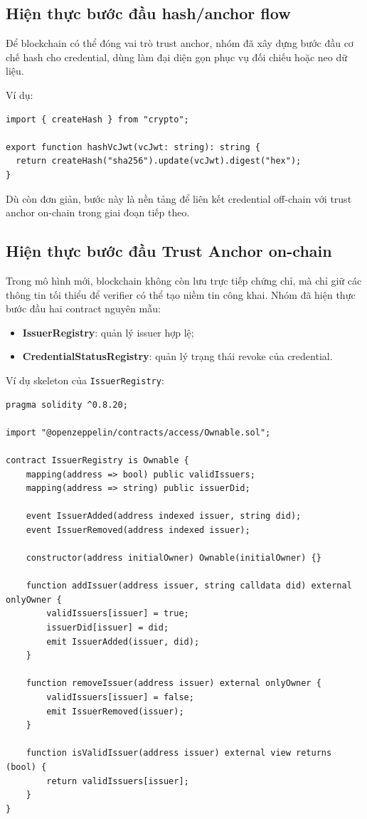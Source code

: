 \subsection{Hiện thực bước đầu hash/anchor flow}

Để blockchain có thể đóng vai trò trust anchor, nhóm đã xây dựng bước đầu cơ chế hash cho credential, dùng làm đại diện gọn phục vụ đối chiếu hoặc neo dữ liệu.

Ví dụ:

\begin{lstlisting}[caption={Hàm tạo hash cho credential}, label={lst:hash_vc_midterm}]
import { createHash } from "crypto";

export function hashVcJwt(vcJwt: string): string {
  return createHash("sha256").update(vcJwt).digest("hex");
}
\end{lstlisting}

Dù còn đơn giản, bước này là nền tảng để liên kết credential off-chain với trust anchor on-chain trong giai đoạn tiếp theo.

\subsection{Hiện thực bước đầu Trust Anchor on-chain}

Trong mô hình mới, blockchain không còn lưu trực tiếp chứng chỉ, mà chỉ giữ các thông tin tối thiểu để verifier có thể tạo niềm tin công khai. Nhóm đã hiện thực bước đầu hai contract nguyên mẫu:

\begin{itemize}
    \item \textbf{IssuerRegistry}: quản lý issuer hợp lệ;
    \item \textbf{CredentialStatusRegistry}: quản lý trạng thái revoke của credential.
\end{itemize}

Ví dụ skeleton của \texttt{IssuerRegistry}:

\begin{lstlisting}[caption={Prototype cho Issuer Registry}, label={lst:issuer_registry_midterm}]
pragma solidity ^0.8.20;

import "@openzeppelin/contracts/access/Ownable.sol";

contract IssuerRegistry is Ownable {
    mapping(address => bool) public validIssuers;
    mapping(address => string) public issuerDid;

    event IssuerAdded(address indexed issuer, string did);
    event IssuerRemoved(address indexed issuer);

    constructor(address initialOwner) Ownable(initialOwner) {}

    function addIssuer(address issuer, string calldata did) external onlyOwner {
        validIssuers[issuer] = true;
        issuerDid[issuer] = did;
        emit IssuerAdded(issuer, did);
    }

    function removeIssuer(address issuer) external onlyOwner {
        validIssuers[issuer] = false;
        emit IssuerRemoved(issuer);
    }

    function isValidIssuer(address issuer) external view returns (bool) {
        return validIssuers[issuer];
    }
}
\end{lstlisting}

